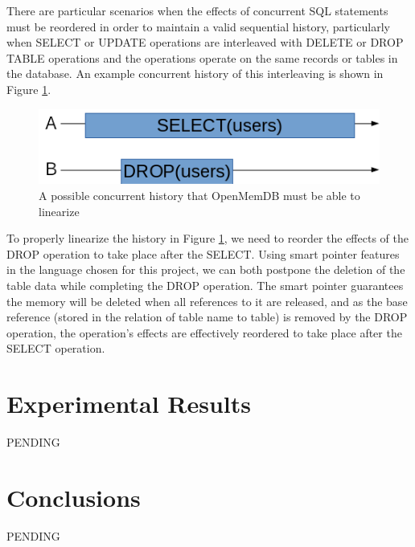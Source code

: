 \documentclass[letter,11pt]{article}
\begin{document}
\par\vspace{\baselineskip}
There are particular scenarios when the effects of concurrent SQL statements must be reordered
in order to maintain a valid sequential history, particularly when SELECT or UPDATE operations
are interleaved with DELETE or DROP TABLE operations and the operations operate on the same 
records or tables in the database. An example concurrent history of this interleaving is shown in 
Figure \ref{concurrent_history}.

\begin{figure}[h]
\centering
  \includegraphics[scale=.75]{concurrent_history_1}
  \caption{A possible concurrent history that OpenMemDB must be able to linearize}
  \label{concurrent_history}
\end{figure}

\par\vspace{\baselineskip}
To properly linearize the history in Figure \ref{concurrent_history}, we need to reorder 
the effects of the DROP operation to take place after the SELECT. Using smart pointer features 
in the language chosen for this project, we can both postpone the deletion of the 
table data while completing the DROP operation. The smart pointer guarantees the memory will 
be deleted when all references to it are released, and as the base reference (stored in the 
relation of table name to table) is removed by the DROP operation, the operation's effects 
are effectively reordered to take place after the SELECT operation.

\section{Experimental Results}
PENDING

\section{Conclusions}
PENDING

\newpage


\newpage
\end{document}
